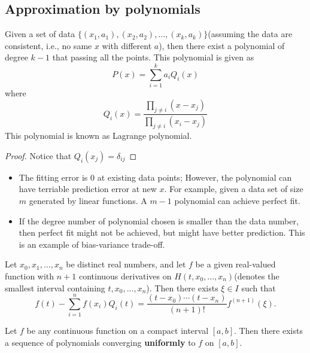 \begin{refsection}
\subsection{Approximation by polynomials}
\begin{lemma}\label{ch:functional-analysis:th:Lagrangepolynomialapproximation}
	\cite[297]{strichartz2000way}Given a set of data $\{(x_1,a_1),(x_2,a_2),...,(x_k,a_k)\}$(assuming the data are consistent, i.e., no same $x$ with different $a$), then there exist a polynomial of degree $k-1$ that passing all the points. This polynomial is given as
	$$P(x) = \sum_{i=1}^k a_i Q_i(x)$$
	where $$Q_i(x) = \frac{\prod_{j\neq i}(x-x_j)}{\prod_{j\neq i}(x_i-x_j)}$$
	This polynomial is known as Lagrange polynomial.
\end{lemma}
\begin{proof}
	Notice that $Q_i(x_j) = \delta_{ij}$
\end{proof}


\begin{remark}[implications]\hfill
	\begin{itemize}
		\item The fitting error is 0 at existing data points; However, the polynomial can have terriable prediction error at new $x$. For example, given a data set of size $m$ generated by linear functions. A $m-1$ polynomial can achieve perfect fit.
		\item If the degree number of polynomial chosen is smaller than the data number, then perfect fit might not be achieved, but might have better prediction. This is an example of bias-variance trade-off. 
	\end{itemize}
\end{remark}


\begin{lemma}\cite[135]{atkinson1989introduction}
	Let $x_0,x_1,...,x_n$ be distinct real numbers, and let $f$ be a given real-valued function with $n+1$ continuous derivatives on $H(t,x_0,...,x_n)$(denotes the smallest interval containing $t,x_0,...,x_n$). Then there exists $\xi \in I$ such that
	$$f(t) - \sum_{i=1}^{n} f(x_i) Q_i(t) = \frac{(t-x_0)\cdots (t-x_n)}{(n+1)!}f^{(n+1)}(\xi).$$ 
\end{lemma}


\begin{theorem}
	\cite[301]{strichartz2000way}Let $f$ be any continuous function on a compact interval $[a,b]$. Then there exists a sequence of polynomials converging \textbf{uniformly} to $f$ on $[a,b]$.
\end{theorem}


\end{refsection}
